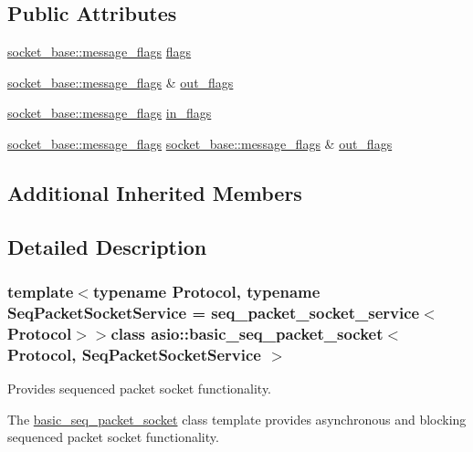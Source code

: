 \subsection*{Public Attributes}
\begin{DoxyCompactItemize}
\item 
\hyperlink{classasio_1_1socket__base_ac3cf77465dfedfe1979b5415cf32cc94}{socket\+\_\+base\+::message\+\_\+flags} \hyperlink{classasio_1_1basic__seq__packet__socket_a075eb37b80c5f14590a257b5202e626f}{flags}
\item 
\hyperlink{classasio_1_1socket__base_ac3cf77465dfedfe1979b5415cf32cc94}{socket\+\_\+base\+::message\+\_\+flags} \& \hyperlink{classasio_1_1basic__seq__packet__socket_a8e5185dc6014d8e5f9e91ab7743ace7c}{out\+\_\+flags}
\item 
\hyperlink{classasio_1_1socket__base_ac3cf77465dfedfe1979b5415cf32cc94}{socket\+\_\+base\+::message\+\_\+flags} \hyperlink{classasio_1_1basic__seq__packet__socket_aabcc430c9e81052d026b2994274c0fd1}{in\+\_\+flags}
\item 
\hyperlink{classasio_1_1socket__base_ac3cf77465dfedfe1979b5415cf32cc94}{socket\+\_\+base\+::message\+\_\+flags} \hyperlink{classasio_1_1socket__base_ac3cf77465dfedfe1979b5415cf32cc94}{socket\+\_\+base\+::message\+\_\+flags} \& \hyperlink{classasio_1_1basic__seq__packet__socket_a63081bd10275f42753f357545f4958b8}{out\+\_\+flags}
\end{DoxyCompactItemize}
\subsection*{Additional Inherited Members}


\subsection{Detailed Description}
\subsubsection*{template$<$typename Protocol, typename Seq\+Packet\+Socket\+Service = seq\+\_\+packet\+\_\+socket\+\_\+service$<$\+Protocol$>$$>$class asio\+::basic\+\_\+seq\+\_\+packet\+\_\+socket$<$ Protocol, Seq\+Packet\+Socket\+Service $>$}

Provides sequenced packet socket functionality. 

The \hyperlink{classasio_1_1basic__seq__packet__socket}{basic\+\_\+seq\+\_\+packet\+\_\+socket} class template provides asynchronous and blocking sequenced packet socket functionality.


